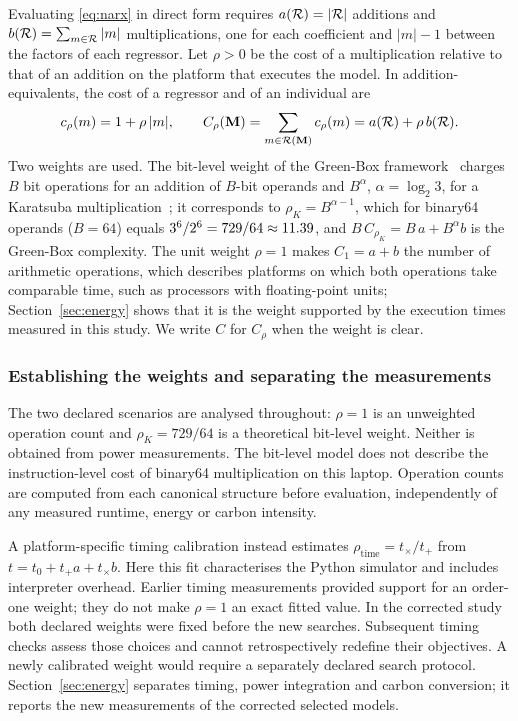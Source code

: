 \begin{definition}\label{def:cost}
Evaluating \eqref{eq:narx} in direct form requires $a(\mathcal{R})=|\mathcal{R}|$ additions and $b(\mathcal{R})=\sum_{m\in\mathcal{R}}|m|$
multiplications, one for each coefficient and $|m|-1$ between the factors of each regressor. Let $\rho>0$ be the cost of
a multiplication relative to that of an addition on the platform that executes the model. In addition-equivalents, the
cost of a regressor and of an individual are
\begin{equation}
c_\rho(m)=1+\rho\,|m|,\qquad
C_\rho(\mathbf{M})=\sum_{m\in\mathcal{R}(\mathbf{M})}c_\rho(m)=a(\mathcal{R})+\rho\,b(\mathcal{R}).
\label{eq:cost}
\end{equation}
Two weights are used. The bit-level weight of the Green-Box framework~\cite{NMN2023} charges $B$ bit
operations for an addition of $B$-bit operands and $B^{\alpha}$, $\alpha=\log_2 3$, for a Karatsuba multiplication~\cite{KO1963}; it corresponds to $\rho_K=B^{\alpha-1}$, which for binary64 operands ($B=64$) equals
$3^6/2^6=729/64\approx11.39$, and $B\,C_{\rho_K}=B\,a+B^{\alpha}b$ is the Green-Box complexity. The unit weight $\rho=1$
makes $C_1=a+b$ the number of arithmetic operations, which describes platforms on which both operations take
comparable time, such as processors with floating-point units; Section~\ref{sec:energy} shows that it is the weight
supported by the execution times measured in this study. We write $C$ for $C_\rho$ when the weight is clear.
\end{definition}

\subsubsection{Establishing the weights and separating the measurements}
The two declared scenarios are analysed throughout: $\rho=1$ is an unweighted operation count and $\rho_K=729/64$ is a theoretical bit-level weight. Neither is obtained from power measurements. The bit-level model does not describe the instruction-level cost of binary64 multiplication on this laptop. Operation counts are computed from each canonical structure before evaluation, independently of any measured runtime, energy or carbon intensity.

A platform-specific timing calibration instead estimates $\rho_{\mathrm{time}}=t_\times/t_+$ from $t=t_0+t_+a+t_\times b$. Here this fit characterises the Python simulator and includes interpreter overhead. Earlier timing measurements provided support for an order-one weight; they do not make $\rho=1$ an exact fitted value. In the corrected study both declared weights were fixed before the new searches. Subsequent timing checks assess those choices and cannot retrospectively redefine their objectives. A newly calibrated weight would require a separately declared search protocol. Section~\ref{sec:energy} separates timing, power integration and carbon conversion; it reports the new measurements of the corrected selected models.

